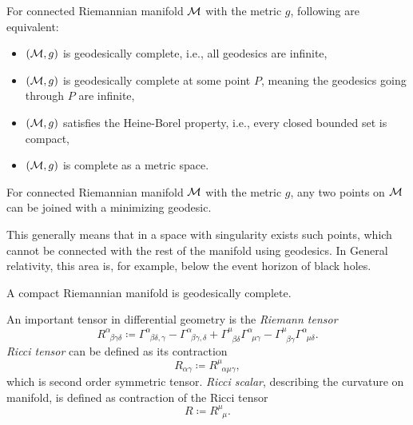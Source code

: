 \begin{thm}\emph{\citet[page 125]{petersen}}
    \label{thm:hopf-Rinow}


    For connected Riemannian manifold $\mathcal{M}$ with the metric $g$, following are equivalent:
    \begin{itemize}
        \item $(\mathcal{M},g)$ is geodesically complete, i.e., all geodesics are infinite,
        \item $(\mathcal{M},g)$ is geodesically complete at some point $P$, meaning the geodesics going through $P$ are infinite,
        \item $(\mathcal{M},g)$ satisfies the Heine-Borel property, i.e., every closed bounded set is compact,
        \item $(\mathcal{M},g)$ is complete as a metric space.
    \end{itemize}
\end{thm}
\begin{thm}\emph{\citet[Chapter 3]{claudio}}
    \label{thm:hopf-Rinow_modified}

    For connected Riemannian manifold $\mathcal{M}$ with the metric $g$, any two points on $\mathcal{M}$ can be joined with a minimizing geodesic.
\end{thm}
This generally means that in a space with singularity exists such points, which cannot be connected with the rest of the manifold using geodesics. In General relativity, this area is, for example, below the event horizon of black holes.

\begin{thm}\emph{\citet[Chapter 3]{claudio}}
    \label{thm:compact}

    A compact Riemannian manifold is geodesically complete.
\end{thm}





An important tensor in differential geometry is the \emph{Riemann tensor}
\begin{equation}
    R^\alpha_{\;\;\beta\gamma\delta}\coloneqq \Gamma^\alpha_{\;\;\beta\delta,\gamma}-\Gamma^\alpha_{\;\;\beta\gamma,\delta}+\Gamma^\mu_{\;\;\beta\delta}\Gamma^\alpha_{\;\;\mu\gamma}-\Gamma^\mu_{\;\;\beta\gamma}\Gamma^\alpha_{\;\;\mu\delta}.
\end{equation}
\emph{Ricci tensor} can be defined as its contraction 
\begin{equation}
    R_{\alpha\gamma}\coloneqq R^\mu_{\;\;\alpha\mu\gamma},
\end{equation}
which is second order symmetric tensor.
\emph{Ricci scalar}, describing the curvature on manifold, is defined as contraction of the Ricci tensor
\begin{equation}
    R\coloneqq R^\mu_{\;\;\mu}.
\end{equation}


